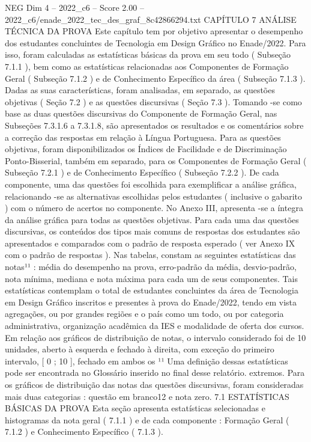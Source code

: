 \begin{textsample}{NEG Dim 4 – 2022\_c6 – Score 2.00 – 2022\_c6/enade\_2022\_tec\_des\_graf\_8c42866294.txt}  \label{ex:f4_neg_274}
CAPÍTULO 7 ANÁLISE TÉCNICA DA PROVA Este capítulo tem por objetivo apresentar o desempenho dos estudantes concluintes de Tecnologia em Design Gráfico no Enade/2022.
Para isso, foram calculadas as estatísticas básicas da prova em seu todo ( Subseção 7.1.1 ), bem como as estatísticas relacionadas aos Componentes de Formação Geral ( Subseção 7.1.2 ) e de Conhecimento Específico da área ( Subseção 7.1.3 ).
Dadas as suas características, foram analisadas, em separado, as questões objetivas ( Seção 7.2 ) e as questões discursivas ( Seção 7.3 ).
Tomando -se como base as duas questões discursivas do Componente de Formação Geral, nas Subseções 7.3.1.6 a 7.3.1.8, são apresentados os resultados e os comentários sobre a correção das respostas em relação à Língua Portuguesa.
Para as questões objetivas, foram disponibilizados os Índices de Facilidade e de Discriminação Ponto-Bisserial, também em separado, para os Componentes de Formação Geral ( Subseção 7.2.1 ) e de Conhecimento Específico ( Subseção 7.2.2 ).
De cada componente, uma das questões foi escolhida para exemplificar a análise gráfica, relacionando -se as alternativas escolhidas pelos estudantes ( inclusive o gabarito ) com o número de acertos no componente.
No Anexo III, apresenta -se a íntegra da análise gráfica para todas as questões objetivas.
Para cada uma das questões discursivas, os conteúdos dos tipos mais comuns de respostas dos estudantes são apresentados e comparados com o padrão de resposta esperado ( ver Anexo IX com o padrão de respostas ).
Nas tabelas, constam as seguintes estatísticas das notas¹¹ : média do desempenho na prova, erro-padrão da média, desvio-padrão, nota mínima, mediana e nota máxima para cada um de seus componentes.
Tais estatísticas contemplam o total de estudantes concluintes da área de Tecnologia em Design Gráfico inscritos e presentes à prova do Enade/2022, tendo em vista agregações, ou por grandes regiões e o país como um todo, ou por categoria administrativa, organização acadêmica da IES e modalidade de oferta dos cursos.
Em relação aos gráficos de distribuição de notas, o intervalo considerado foi de 10 unidades, aberto à esquerda e fechado à direita, com exceção do primeiro intervalo, [ 0 ; 10 ], fechado em ambos os ¹¹ Uma definição dessas estatísticas pode ser encontrada no Glossário inserido no final desse relatório. extremos.
Para os gráficos de distribuição das notas das questões discursivas, foram consideradas mais duas categorias : questão em branco12 e nota zero. 7.1 ESTATÍSTICAS BÁSICAS DA PROVA Esta seção apresenta estatísticas selecionadas e histogramas da nota geral ( 7.1.1 ) e de cada componente : Formação Geral ( 7.1.2 ) e Conhecimento Específico ( 7.1.3 ).

\end{textsample}

